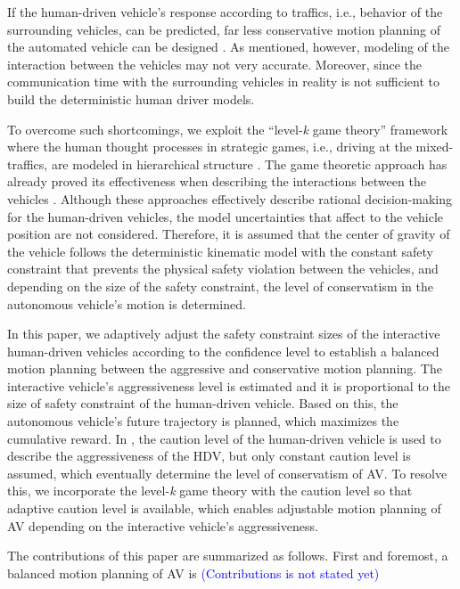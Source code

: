 \documentclass[10pt,journal]{IEEEtran}
\begin{document}
	If the human-driven vehicle's response according to traffics, i.e., behavior of the surrounding vehicles, can be predicted, far less conservative motion planning of the automated vehicle can be designed \cite{Sadigh2016}. As mentioned, however, modeling of the interaction between the vehicles may not very accurate. Moreover, since the communication time with the surrounding vehicles in reality is not sufficient to build the deterministic human driver models.
	
	To overcome such shortcomings, we exploit the ``level-\textit{k} game theory'' framework where the human thought processes in strategic games, i.e., driving at the mixed-traffics, are modeled in hierarchical structure \cite{Stahl1993}. The game theoretic approach has already proved its effectiveness when describing the interactions between the vehicles \cite{Li2017, Li2018, Tian2018}. Although these approaches effectively describe rational decision-making for the human-driven vehicles, the model uncertainties that affect to the vehicle position are not considered. Therefore, it is assumed that the center of gravity of the vehicle follows the deterministic kinematic model with the constant safety constraint that prevents the physical safety violation between the vehicles, and depending on the size of the safety constraint, the level of conservatism in the autonomous vehicle's motion is determined. 
	
	In this paper, we adaptively adjust the safety constraint sizes of the interactive human-driven vehicles according to the confidence level to establish a balanced motion planning between the aggressive and conservative motion planning. The interactive vehicle's aggressiveness level is estimated and it is proportional to the size of safety constraint of the human-driven vehicle. Based on this, the autonomous vehicle's future trajectory is planned, which maximizes the cumulative reward. In \cite{Jin2019}, the caution level of the human-driven vehicle is used to describe the aggressiveness of the HDV, but only constant caution level is assumed, which eventually determine the level of conservatism of AV. To resolve this, we incorporate the level-\textit{k} game theory with the caution level so that adaptive caution level is available, which enables adjustable motion planning of AV depending on the interactive vehicle's aggressiveness.
	
	The contributions of this paper are summarized as follows. First and foremost, a balanced motion planning of AV is 
	\textcolor{blue}{(Contributions is not stated yet)}
	
\end{document}
